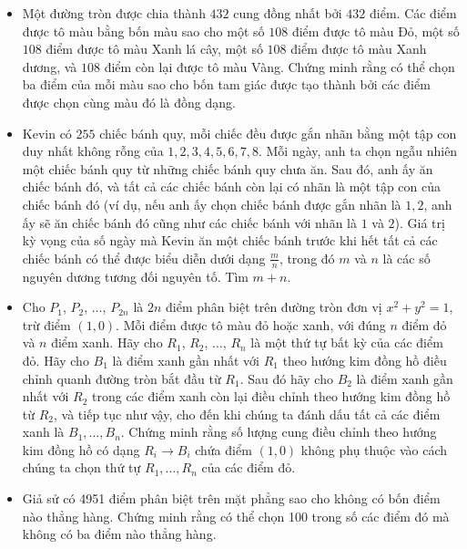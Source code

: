 \documentclass[11pt]{scrartcl}
\begin{document}
\begin{itemize}[label=, leftmargin=0em, itemsep=-0em]
    \item \begin{btvn}
        Một đường tròn được chia thành $432$ cung đồng nhất bởi $432$ điểm. Các điểm được tô màu bằng bốn màu sao cho một số $108$ điểm được tô màu Đỏ, một số $108$ điểm được tô màu Xanh lá cây, một số $108$ điểm được tô màu Xanh dương, và $108$ điểm còn lại được tô màu Vàng. Chứng minh rằng có thể chọn ba điểm của mỗi màu sao cho bốn tam giác được tạo thành bởi các điểm được chọn cùng màu đó là đồng dạng.
    \end{btvn}

    

    \item \begin{btvn}
        Kevin có $255$ chiếc bánh quy, mỗi chiếc đều được gắn nhãn bằng một tập con duy nhất không rỗng của ${1,2,3,4,5,6,7,8}$. Mỗi ngày, anh ta chọn ngẫu nhiên một chiếc bánh quy từ những chiếc bánh quy chưa ăn. Sau đó, anh ấy ăn chiếc bánh đó, và tất cả các chiếc bánh còn lại có nhãn là một tập con của chiếc bánh đó (ví dụ, nếu anh ấy chọn chiếc bánh được gắn nhãn là ${1,2}$, anh ấy sẽ ăn chiếc bánh đó cũng như các chiếc bánh với nhãn là ${1}$ và ${2}$). Giá trị kỳ vọng của số ngày mà Kevin ăn một chiếc bánh trước khi hết tất cả các chiếc bánh có thể được biểu diễn dưới dạng $\frac{m}{n}$, trong đó $m$ và $n$ là các số nguyên dương tương đối nguyên tố. Tìm $m + n$.
    \end{btvn}

    \item \begin{btvn}
        Cho $P_1$, $P_2$, $\dots$, $P_{2n}$ là $2n$ điểm phân biệt trên đường tròn đơn vị $x^2+y^2=1$, trừ điểm $(1,0)$. Mỗi điểm được tô màu đỏ hoặc xanh, với đúng $n$ điểm đỏ và $n$ điểm xanh. Hãy cho $R_1$, $R_2$, $\dots$, $R_n$ là một thứ tự bất kỳ của các điểm đỏ. Hãy cho $B_1$ là điểm xanh gần nhất với $R_1$ theo hướng kim đồng hồ điều chỉnh quanh đường tròn bắt đầu từ $R_1$. Sau đó hãy cho $B_2$ là điểm xanh gần nhất với $R_2$ trong các điểm xanh còn lại điều chỉnh theo hướng kim đồng hồ từ $R_2$, và tiếp tục như vậy, cho đến khi chúng ta đánh dấu tất cả các điểm xanh là $B_1, \dots, B_n$. Chứng minh rằng số lượng cung điều chỉnh theo hướng kim đồng hồ có dạng $R_i \to B_i$ chứa điểm $(1,0)$ không phụ thuộc vào cách chúng ta chọn thứ tự $R_1, \dots, R_n$ của các điểm đỏ.
    \end{btvn}

    \item \begin{btvn}
        Giả sử có 4951 điểm phân biệt trên mặt phẳng sao cho không có bốn điểm nào thẳng hàng. Chứng minh rằng có thể chọn 100 trong số các điểm đó mà không có ba điểm nào thẳng hàng.
    \end{btvn}


\end{itemize}
\end{document}
